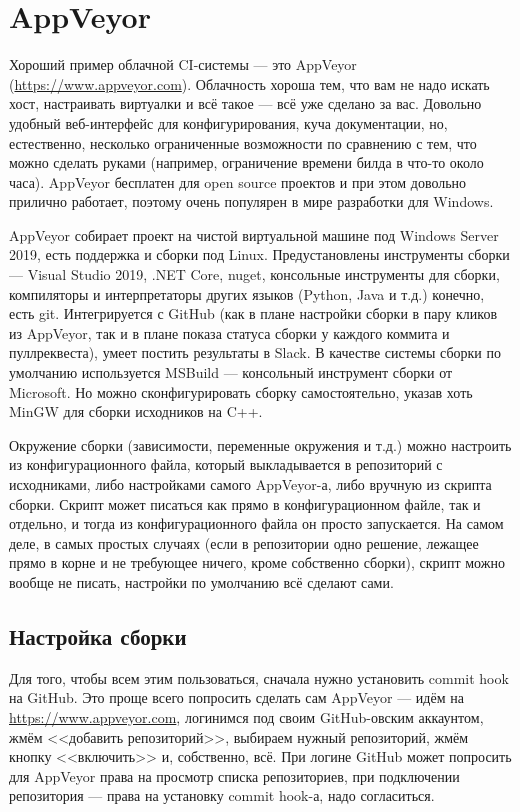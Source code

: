 \documentclass[a5paper]{article}
\begin{document}
\section{AppVeyor}

Хороший пример облачной CI-системы --- это AppVeyor (\url{https://www.appveyor.com}). Облачность хороша тем, что вам не надо искать хост, настраивать виртуалки и всё такое --- всё уже сделано за вас. Довольно удобный веб-интерфейс для конфигурирования, куча документации, но, естественно, несколько ограниченные возможности по сравнению с тем, что можно сделать руками (например, ограничение времени билда в что-то около часа). AppVeyor бесплатен для open source проектов и при этом довольно прилично работает, поэтому очень популярен в мире разработки для Windows.

AppVeyor собирает проект на чистой виртуальной машине под Windows Server 2019, есть поддержка и сборки под Linux. Предустановлены инструменты сборки --- Visual Studio 2019, .NET Core, nuget, консольные инструменты для сборки, компиляторы и интерпретаторы других языков (Python, Java и т.д.) конечно, есть git. Интегрируется с GitHub (как в плане настройки сборки в пару кликов из AppVeyor, так и в плане показа статуса сборки у каждого коммита и пуллреквеста), умеет постить результаты в Slack. В качестве системы сборки по умолчанию используется MSBuild --- консольный инструмент сборки от Microsoft. Но можно сконфигурировать сборку самостоятельно, указав хоть MinGW для сборки исходников на C++.

Окружение сборки (зависимости, переменные окружения и т.д.) можно настроить из конфигурационного файла, который выкладывается в репозиторий с исходниками, либо настройками самого AppVeyor-а, либо вручную из скрипта сборки. Скрипт может писаться как прямо в конфигурационном файле, так и отдельно, и тогда из конфигурационного файла он просто запускается. На самом деле, в самых простых случаях (если в репозитории одно решение, лежащее прямо в корне и не требующее ничего, кроме собственно сборки), скрипт можно вообще не писать, настройки по умолчанию всё сделают сами.

\subsection{Настройка сборки}

Для того, чтобы всем этим пользоваться, сначала нужно установить commit hook на GitHub. Это проще всего попросить сделать сам AppVeyor --- идём на \url{https://www.appveyor.com}, логинимся под своим GitHub-овским аккаунтом, жмём <<добавить репозиторий>>, выбираем нужный репозиторий, жмём кнопку <<включить>> и, собственно, всё. При логине GitHub может попросить для AppVeyor права на просмотр списка репозиториев, при подключении репозитория --- права на установку commit hook-а, надо согласиться.
\end{document}
